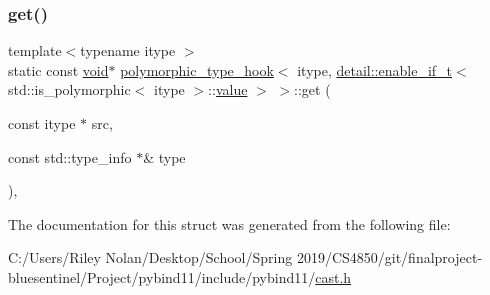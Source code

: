 \subsubsection{\texorpdfstring{get()}{get()}}
{\footnotesize\ttfamily template$<$typename itype $>$ \\
static const \mbox{\hyperlink{_s_d_l__opengles2__gl2ext_8h_ae5d8fa23ad07c48bb609509eae494c95}{void}}$\ast$ \mbox{\hyperlink{structpolymorphic__type__hook}{polymorphic\+\_\+type\+\_\+hook}}$<$ itype, \mbox{\hyperlink{detail_2common_8h_a012819c9e8b5e04872a271f50f8b8196}{detail\+::enable\+\_\+if\+\_\+t}}$<$ std\+::is\+\_\+polymorphic$<$ itype $>$\+::\mbox{\hyperlink{_s_d_l__opengl__glext_8h_a8ad81492d410ff2ac11f754f4042150f}{value}} $>$ $>$\+::get (\begin{DoxyParamCaption}\item[{const itype $\ast$}]{src,  }\item[{const std\+::type\+\_\+info $\ast$\&}]{type }\end{DoxyParamCaption})\hspace{0.3cm}{\ttfamily [inline]}, {\ttfamily [static]}}



The documentation for this struct was generated from the following file\+:\begin{DoxyCompactItemize}
\item 
C\+:/\+Users/\+Riley Nolan/\+Desktop/\+School/\+Spring 2019/\+C\+S4850/git/finalproject-\/bluesentinel/\+Project/pybind11/include/pybind11/\mbox{\hyperlink{cast_8h}{cast.\+h}}\end{DoxyCompactItemize}

